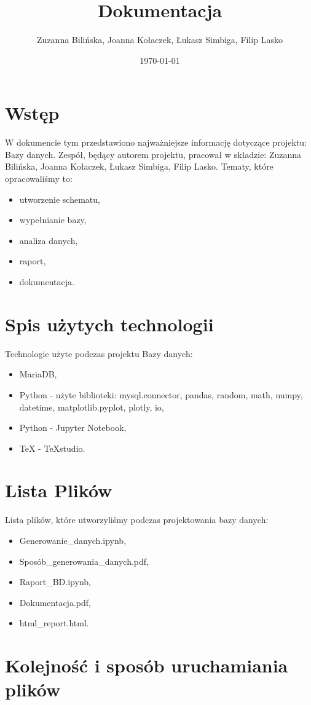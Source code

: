 \documentclass{article}
\title{Dokumentacja}
\author{Zuzanna Bilińska, Joanna Kołaczek, Łukasz Simbiga, Filip Lasko}
\date{\today}
\theoremstyle{break}
\begin{document}
	\maketitle
	\tableofcontents
	\clearpage
	
	
	\section{Wstęp}
	W dokumencie tym przedstawiono najważniejsze informację dotyczące projektu: Bazy danych. 
	Zespół, będący autorem projektu, pracował w składzie: Zuzanna Bilińska, Joanna Kołaczek, Łukasz Simbiga, Filip Lasko. Tematy, które opracowaliśmy to:
	\begin{itemize}
		\item utworzenie schematu,
		\item wypełnianie bazy,
		\item analiza danych,
		\item raport,
		\item dokumentacja.
	\end{itemize}
	
	\section{Spis użytych technologii}
	Technologie użyte podczas projektu Bazy danych:
	\begin{itemize}
		\item MariaDB,
		\item Python - użyte biblioteki: mysql.connector, pandas, random, math, numpy, datetime, matplotlib.pyplot, plotly, io,
		\item Python - Jupyter Notebook,
		\item TeX - TeXstudio.
	\end{itemize}
	\section{Lista Plików}
	Lista plików, które utworzyliśmy podczas projektowania bazy danych:
	\begin{itemize}
		\item Generowanie\_danych.ipynb,
		\item Sposób\_generowania\_danych.pdf,
		\item Raport\_BD.ipynb,
		\item Dokumentacja.pdf,
		\item html\_report.html.
	\end{itemize}
	\section{Kolejność i sposób uruchamiania plików}
\end{document}
